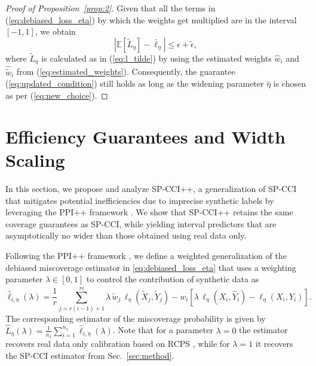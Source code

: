 \documentclass{article}
\theoremstyle{plain}
\theoremstyle{definition}
\theoremstyle{remark}
\begin{document}
\begin{proof}[Proof of Proposition~\ref{prop:2}]
    Given that all the terms in (\ref{eq:debiased_loss_eta}) by which the weights get multiplied are in the interval $[-1, 1]$, we obtain
\begin{equation}
\left| \mathbb{E}[\tilde{L}_\eta] - \bar{\ell}_\eta \right|
\leq \epsilon + \tilde{\epsilon},
\end{equation}
where $\tilde{L}_\eta$ is calculated as in (\ref{eq:l_tilde}) by using the estimated weights $\hat{w}_i$ and $\hat{\tilde{w}}_i$ from (\ref{eq:estimated_weights}). Consequently, the guarantee (\ref{eq:updated_condition}) still holds as long as the widening parameter \( \hat{\eta} \) is chosen as per (\ref{eq:new_choice}).
\end{proof}


\section{Efficiency Guarantees and Width Scaling}
\label{appendix:efficiency_proof}

In this section, we propose and analyze SP-CCI++, a generalization of SP-CCI that mitigates potential inefficiencies due to imprecise synthetic labels by leveraging the PPI++ framework \citep{angelopoulos2023ppi++}. We show that SP-CCI++ retains the same coverage guarantees as SP-CCI, while yielding interval predictors that are asymptotically no wider than those obtained using real data only.

Following the PPI++ framework \citep{angelopoulos2023ppi++}, we define a weighted generalization of the debiased miscoverage estimator in \eqref{eq:debiased_loss_eta} that uses a weighting parameter $\lambda \in [0,1]$ to control the contribution of synthetic data as
\begin{equation}
\label{eq:debiased_loss_eta_pp}
\hat{\ell}_{i,\eta}(\lambda)
=
\frac{1}{r}
\sum_{j=r(i-1)+1}^{ri}
\lambda\,\tilde{w}_j\,\ell_\eta(\tilde{X}_j,\tilde{Y}_j)
-
w_i
\left[
\lambda\,\ell_\eta(X_i,\hat{Y}_i)
-
\ell_\eta(X_i,Y_i)
\right].
\end{equation}
The corresponding estimator of the miscoverage probability is given by $\hat{L}_\eta(\lambda) = \frac{1}{n_1}\sum_{i=1}^{n_1}\hat{\ell}_{i,\eta}(\lambda)$.
Note that for a parameter $\lambda = 0$ the estimator recovers real data only calibration based on RCPS \citep{bates2021distribution}, while for $\lambda = 1$ it recovers the SP-CCI estimator from Sec.~\ref{sec:method}.
\end{document}
